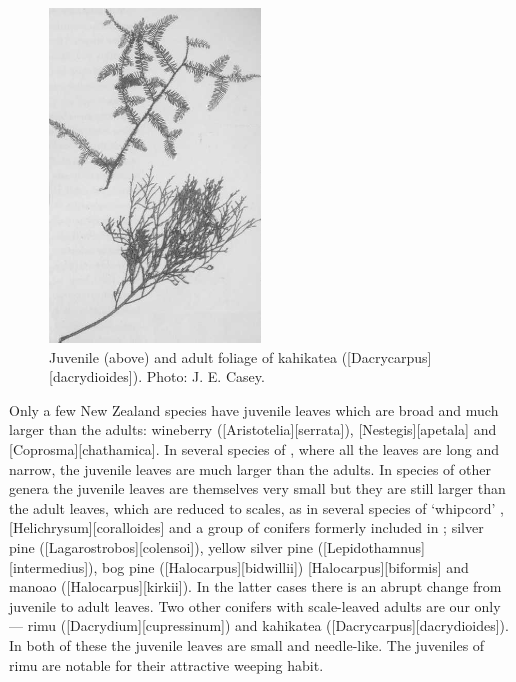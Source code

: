 \begin{figure}
	\includegraphics[width=0.5\textwidth]{graphics/figure22kahikatea.jpg}
	\centering
	\caption[Kahikatea foliage]{Juvenile (above) and adult foliage of kahikatea ([Dacrycarpus][dacrydioides]).
	Photo: J. E. Casey.}%
	\label{fig:22kahikatea}
\end{figure}

Only a few New Zealand species have juvenile leaves which are broad and much larger than the adults: wineberry ([Aristotelia][serrata]), [Nestegis][apetala] and [Coprosma][chathamica].
In several species of , where all the leaves are long and narrow, the juvenile leaves are much larger than the adults.
In species of other genera the juvenile leaves are themselves very small but they are still larger than the adult leaves, which are reduced to scales, as in several species of `whipcord' , [Helichrysum][coralloides] and a group of conifers formerly included in ; silver pine ([Lagarostrobos][colensoi]), yellow silver pine ([Lepidothamnus][intermedius]), bog pine ([Halocarpus][bidwillii]) [Halocarpus][biformis] and manoao ([Halocarpus][kirkii]).
In the latter cases there is an abrupt change from juvenile to adult leaves.
Two other conifers with scale-leaved adults are our only  --- rimu ([Dacrydium][cupressinum]) and kahikatea ([Dacrycarpus][dacrydioides]).
In both of these the juvenile leaves are small and needle-like.
The juveniles of rimu are notable for their attractive weeping habit.


